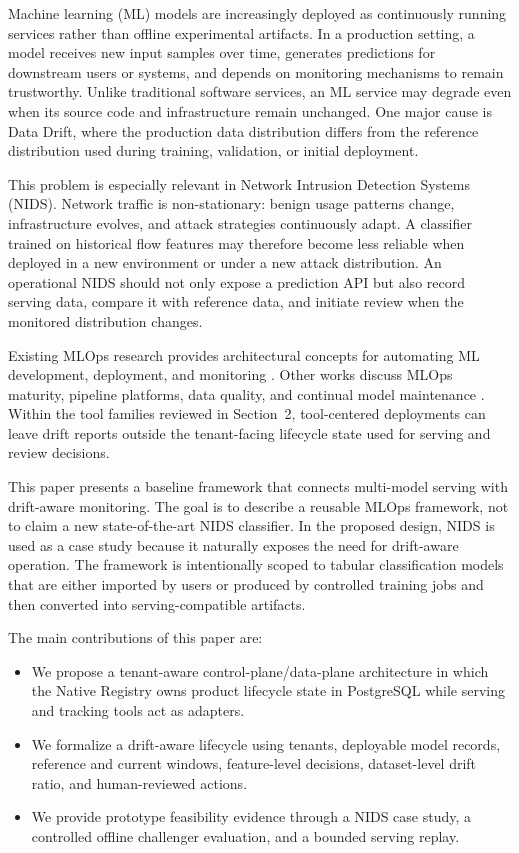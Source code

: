 \documentclass[runningheads]{llncs}
\begin{document}
Machine learning (ML) models are increasingly deployed as continuously running services rather than offline experimental artifacts. In a production setting, a model receives new input samples over time, generates predictions for downstream users or systems, and depends on monitoring mechanisms to remain trustworthy. Unlike traditional software services, an ML service may degrade even when its source code and infrastructure remain unchanged. One major cause is Data Drift, where the production data distribution differs from the reference distribution used during training, validation, or initial deployment.

This problem is especially relevant in Network Intrusion Detection Systems (NIDS). Network traffic is non-stationary: benign usage patterns change, infrastructure evolves, and attack strategies continuously adapt. A classifier trained on historical flow features may therefore become less reliable when deployed in a new environment or under a new attack distribution. An operational NIDS should not only expose a prediction API but also record serving data, compare it with reference data, and initiate review when the monitored distribution changes.

Existing MLOps research provides architectural concepts for automating ML development, deployment, and monitoring \cite{kreuzberger2023mlops}. Other works discuss MLOps maturity, pipeline platforms, data quality, and continual model maintenance \cite{john2021towards,subramanya2022devops,renggli2021data}. Within the tool families reviewed in Section~2, tool-centered deployments can leave drift reports outside the tenant-facing lifecycle state used for serving and review decisions.

This paper presents a baseline framework that connects multi-model serving with drift-aware monitoring. The goal is to describe a reusable MLOps framework, not to claim a new state-of-the-art NIDS classifier. In the proposed design, NIDS is used as a case study because it naturally exposes the need for drift-aware operation. The framework is intentionally scoped to tabular classification models that are either imported by users or produced by controlled training jobs and then converted into serving-compatible artifacts.

The main contributions of this paper are:

\begin{itemize}
    \item We propose a tenant-aware control-plane/data-plane architecture in which the Native Registry owns product lifecycle state in PostgreSQL while serving and tracking tools act as adapters.
    \item We formalize a drift-aware lifecycle using tenants, deployable model records, reference and current windows, feature-level decisions, dataset-level drift ratio, and human-reviewed actions.
    \item We provide prototype feasibility evidence through a NIDS case study, a controlled offline challenger evaluation, and a bounded serving replay.
\end{itemize}
\end{document}
